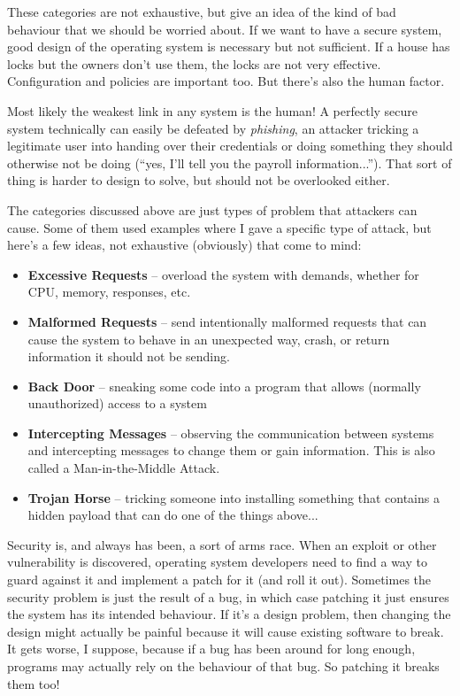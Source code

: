 These categories are not exhaustive, but give an idea of the kind of bad behaviour that we should be worried about. If we want to have a secure system, good design of the operating system is necessary but not sufficient. If a house has locks but the owners don't use them, the locks are not very effective. Configuration and policies are important too. But there's also the human factor.

Most likely the weakest link in any system is the human! A perfectly secure system technically can easily be defeated by \textit{phishing}, an attacker tricking a legitimate user into handing over their credentials or doing something they should otherwise not be doing (``yes, I'll tell you the payroll information...''). That sort of thing is harder to design to solve, but should not be overlooked either.

The categories discussed above are just types of problem that attackers can cause. Some of them used examples where I gave a specific type of attack, but here's a few ideas, not exhaustive (obviously) that come to mind:

\begin{itemize}
	\item \textbf{Excessive Requests} -- overload the system with demands, whether for CPU, memory, responses, etc.
	\item \textbf{Malformed Requests} -- send intentionally malformed requests that can cause the system to behave in an unexpected way, crash, or return information it should not be sending.
	\item \textbf{Back Door} -- sneaking some code into a program that allows (normally unauthorized) access to a system
	\item \textbf{Intercepting Messages} -- observing the communication between systems and intercepting messages to change them or gain information. This is also called a Man-in-the-Middle Attack.
	\item \textbf{Trojan Horse} -- tricking someone into installing something that contains a hidden payload that can do one of the things above...
\end{itemize}

Security is, and always has been, a sort of arms race. When an exploit or other vulnerability is discovered, operating system developers need to find a way to guard against it and implement a patch for it (and roll it out). Sometimes the security problem is just the result of a bug, in which case patching it just ensures the system has its intended behaviour. If it's a design problem, then changing the design might actually be painful because it will cause existing software to break. It gets worse, I suppose, because if a bug has been around for long enough, programs may actually rely on the behaviour of that bug. So patching it breaks them too!

